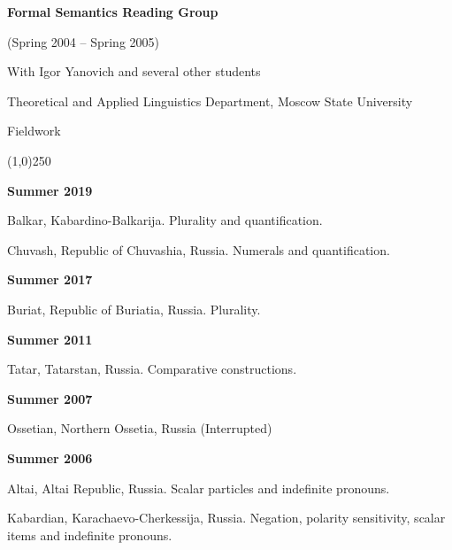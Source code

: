 \documentclass[12pt,letterpaper]{article}
\begin{document}
{\small{
\noindent\textbf{Formal Semantics Reading Group}

(Spring 2004 -- Spring 2005)

With Igor Yanovich and several other students

Theoretical and Applied Linguistics Department, Moscow State University 
 }

\vspace{5mm}

\noindent \Large{Fieldwork}

\vspace{-4mm}
\noindent\line(1,0){250}

\vspace{2mm}

\small{


\noindent\textbf{Summer 2019}

Balkar, Kabardino-Balkarija. Plurality and quantification.
\vspace{1mm}

Chuvash, Republic of Chuvashia, Russia. Numerals and quantification.


\vspace{2mm}

\small{
\noindent\textbf{Summer 2017}

Buriat, Republic of Buriatia, Russia. Plurality. 

\vspace{2mm}

\small{
\noindent\textbf{Summer 2011}

Tatar, Tatarstan, Russia. Comparative constructions. 

\vspace{2mm}

\small{
\noindent\textbf{Summer 2007}

Ossetian, Northern Ossetia, Russia (Interrupted)

\vspace{2mm}

\noindent\textbf{Summer 2006}

Altai, Altai Republic, Russia. Scalar particles and indefinite pronouns.

\vspace{1mm}

Kabardian, Karachaevo-Cherkessija, Russia. Negation, polarity sensitivity, 
scalar items and indefinite pronouns.

}}}}}
\end{document}
